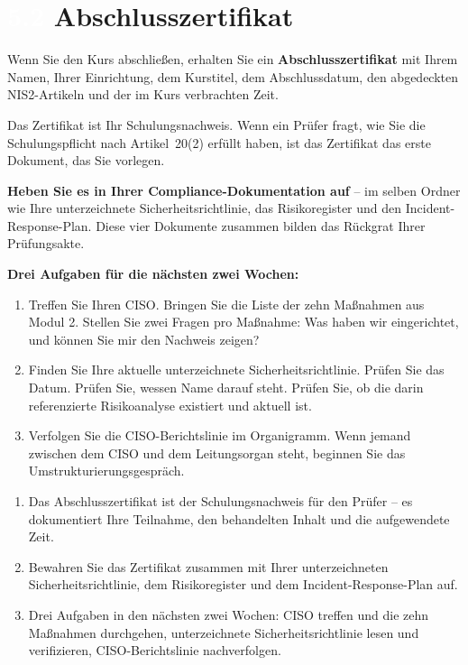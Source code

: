 \documentclass[11pt,a4paper,twoside]{book}
\newcommand{\lessontag}[1]{%
  \texorpdfstring{%
    \setlength{\fboxsep}{3pt}\colorbox{nisd2blue}{\textcolor{white}{\footnotesize\bfseries #1}}\quad%
  }{Lektion #1\ }%
}
\begin{document}
\section{\lessontag{5.2}Abschlusszertifikat}

Wenn Sie den Kurs abschließen, erhalten Sie ein \textbf{Abschlusszertifikat} mit Ihrem Namen, Ihrer Einrichtung, dem Kurstitel, dem Abschlussdatum, den abgedeckten NIS2-Artikeln und der im Kurs verbrachten Zeit.

Das Zertifikat ist Ihr Schulungsnachweis. Wenn ein Prüfer fragt, wie Sie die Schulungspflicht nach Artikel~20(2) erfüllt haben, ist das Zertifikat das erste Dokument, das Sie vorlegen.

\textbf{Heben Sie es in Ihrer Compliance-Dokumentation auf} -- im selben Ordner wie Ihre unterzeichnete Sicherheitsrichtlinie, das Risikoregister und den Incident-Response-Plan. Diese vier Dokumente zusammen bilden das Rückgrat Ihrer Prüfungsakte.

\textbf{Drei Aufgaben für die nächsten zwei Wochen:}
\begin{enumerate}
  \item Treffen Sie Ihren CISO. Bringen Sie die Liste der zehn Maßnahmen aus Modul 2. Stellen Sie zwei Fragen pro Maßnahme: Was haben wir eingerichtet, und können Sie mir den Nachweis zeigen?
  \item Finden Sie Ihre aktuelle unterzeichnete Sicherheitsrichtlinie. Prüfen Sie das Datum. Prüfen Sie, wessen Name darauf steht. Prüfen Sie, ob die darin referenzierte Risikoanalyse existiert und aktuell ist.
  \item Verfolgen Sie die CISO-Berichtslinie im Organigramm. Wenn jemand zwischen dem CISO und dem Leitungsorgan steht, beginnen Sie das Umstrukturierungsgespräch.
\end{enumerate}

\begin{keytakeaways}
\begin{enumerate}
  \item Das Abschlusszertifikat ist der Schulungsnachweis für den Prüfer -- es dokumentiert Ihre Teilnahme, den behandelten Inhalt und die aufgewendete Zeit.
  \item Bewahren Sie das Zertifikat zusammen mit Ihrer unterzeichneten Sicherheitsrichtlinie, dem Risikoregister und dem Incident-Response-Plan auf.
  \item Drei Aufgaben in den nächsten zwei Wochen: CISO treffen und die zehn Maßnahmen durchgehen, unterzeichnete Sicherheitsrichtlinie lesen und verifizieren, CISO-Berichtslinie nachverfolgen.
\end{enumerate}
\end{keytakeaways}
\end{document}
